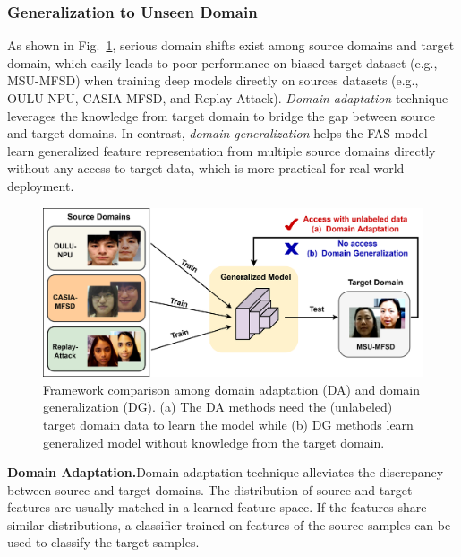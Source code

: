 \documentclass[10pt,journal,compsoc]{IEEEtran}
\begin{document}
\subsubsection{Generalization to Unseen Domain}





As shown in Fig.~\ref{fig:domain}, serious domain shifts exist among source domains and target domain, which easily leads to poor performance on biased target dataset (e.g., MSU-MFSD) when training deep models directly on sources datasets (e.g., OULU-NPU, CASIA-MFSD, and Replay-Attack). \textit{Domain adaptation} technique leverages the knowledge from target domain to bridge the gap between source and target domains. In contrast, \textit{domain generalization} helps the FAS model learn generalized feature representation from multiple source domains directly without any access to target data, which is more practical for real-world deployment. 



\begin{figure}
\centering
\includegraphics[scale=0.4]{Figures/domain.png}
  \caption{ 
Framework comparison among domain adaptation (DA) and domain generalization (DG). (a) The DA methods need the (unlabeled) target domain data to learn the model while (b) DG methods learn generalized model without knowledge from the target domain.}
\label{fig:domain}
\end{figure}




\vspace{0.4em}
\noindent\textbf{Domain Adaptation.}\quad    Domain adaptation technique alleviates the discrepancy between source and target domains. The distribution of source and target features are usually matched in a learned feature space. If the features share similar distributions, a classifier trained on features of the source samples can be used to classify the target samples.
\end{document}
